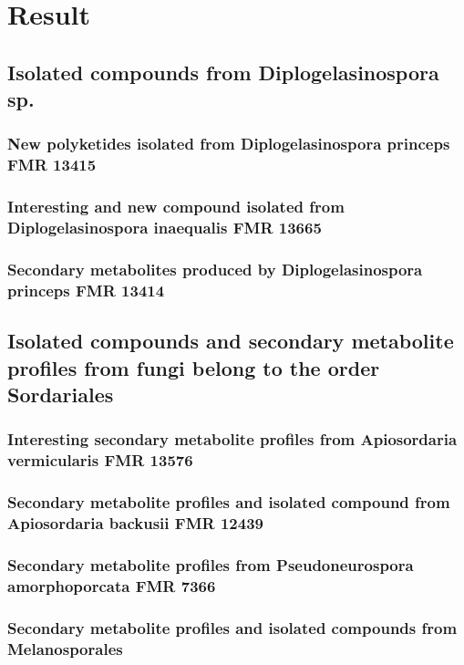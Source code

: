 \chapter{Result}

\section{Isolated compounds from Diplogelasinospora sp.}
\subsection{New polyketides isolated from Diplogelasinospora princeps FMR 13415}
\subsection{Interesting and new compound isolated from Diplogelasinospora
inaequalis FMR 13665}
\subsection{Secondary metabolites produced by Diplogelasinospora princeps FMR 13414}

\section{Isolated compounds and secondary metabolite profiles from fungi
belong to the order Sordariales}
\subsection{Interesting secondary metabolite profiles from Apiosordaria vermicularis
FMR 13576}
\subsection{Secondary metabolite profiles and isolated compound from Apiosordaria
backusii FMR 12439}
\subsection{Secondary metabolite profiles from Pseudoneurospora amorphoporcata
FMR 7366}
\subsection{Secondary metabolite profiles and isolated compounds from
Melanosporales}























